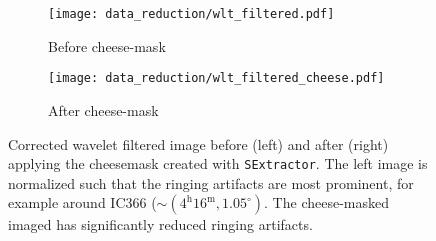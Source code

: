 \begin{figure}[htbp]
    \centering
    \begin{subfigure}[b]{0.48\textwidth}
        \centering
        \texttt{[image: data\_reduction/wlt\_filtered.pdf]}
        \caption{Before cheese-mask}
        \label{fig:wlt_filtered}
    \end{subfigure}
    \hfill
    \begin{subfigure}[b]{0.48\textwidth}
        \centering
        \texttt{[image: data\_reduction/wlt\_filtered\_cheese.pdf]}
        \caption{After cheese-mask}
        \label{fig:wvl_filtered_cheesed}
    \end{subfigure}
    \caption{Corrected wavelet filtered image before (left) and after (right) applying the cheesemask created with \texttt{SExtractor}. The left image is normalized such that the ringing artifacts are most prominent, for example around IC366 (\(\sim(4^\mathrm{h} 16^\mathrm{m}, 1.05^\circ)\). The cheese-masked imaged has significantly reduced ringing artifacts.}
    \label{fig:comparison_wvl_filtered}
\end{figure}






